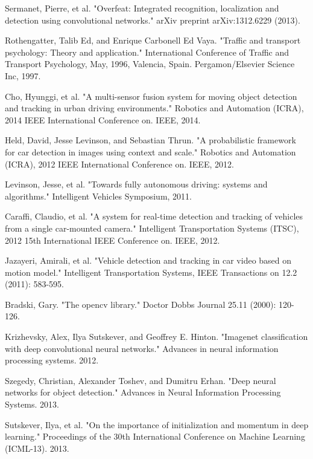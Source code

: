 \documentclass[journal]{IEEEtran}
\begin{document}
\begin{thebibliography}{1}

Sermanet, Pierre, et al. "Overfeat: Integrated recognition, localization and detection using convolutional networks." arXiv preprint arXiv:1312.6229 (2013).

Rothengatter, Talib Ed, and Enrique Carbonell Ed Vaya. "Traffic and transport psychology: Theory and application." International Conference of Traffic and Transport Psychology, May, 1996, Valencia, Spain. Pergamon/Elsevier Science Inc, 1997.

Cho, Hyunggi, et al. "A multi-sensor fusion system for moving object detection and tracking in urban driving environments." Robotics and Automation (ICRA), 2014 IEEE International Conference on. IEEE, 2014.

Held, David, Jesse Levinson, and Sebastian Thrun. "A probabilistic framework for car detection in images using context and scale." Robotics and Automation (ICRA), 2012 IEEE International Conference on. IEEE, 2012.

Levinson, Jesse, et al. "Towards fully autonomous driving: systems and algorithms." Intelligent Vehicles Symposium, 2011. 


Caraffi, Claudio, et al. "A system for real-time detection and tracking of vehicles from a single car-mounted camera." Intelligent Transportation Systems (ITSC), 2012 15th International IEEE Conference on. IEEE, 2012.

Jazayeri, Amirali, et al. "Vehicle detection and tracking in car video based on motion model." Intelligent Transportation Systems, IEEE Transactions on 12.2 (2011): 583-595.

Bradski, Gary. "The opencv library." Doctor Dobbs Journal 25.11 (2000): 120-126.

Krizhevsky, Alex, Ilya Sutskever, and Geoffrey E. Hinton. "Imagenet classification with deep convolutional neural networks." Advances in neural information processing systems. 2012.

Szegedy, Christian, Alexander Toshev, and Dumitru Erhan. "Deep neural networks for object detection." Advances in Neural Information Processing Systems. 2013.

Sutskever, Ilya, et al. "On the importance of initialization and momentum in deep learning." Proceedings of the 30th International Conference on Machine Learning (ICML-13). 2013.


\end{thebibliography}
\end{document}
